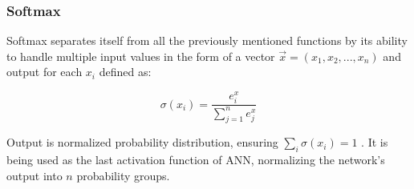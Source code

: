 \subsubsection{Softmax}

Softmax separates itself from all the previously mentioned functions by its ability to handle multiple input values in the form of a vector $\vec{x} = (x_1,x_2,...,x_n)$ and output for each $x_i$ defined as:

\begin{equation}
    {\sigma(x_i) = \frac{e^x_i}{\sum_{j=1}^{n}e^x_j}}
\end{equation}

Output is normalized probability distribution, ensuring $\sum_{i}\sigma(x_i) = 1$ \cite{lipton2015critical}. It is being used as the last activation function of ANN, normalizing the network's output into $n$ probability groups.

